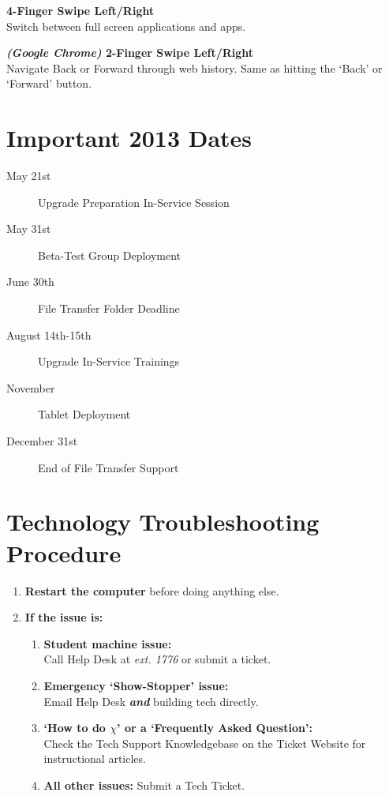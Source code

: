 \documentclass[10pt,foldmark,notumble]{leaflet}
\begin{document}
\textbf{4-Finger Swipe Left/Right}\\
Switch between full screen applications and apps.

\textbf{\emph{(Google Chrome)} 2-Finger Swipe Left/Right}\\
Navigate Back or Forward through web history. Same as hitting the `Back' or `Forward' button.

\section{Important 2013 Dates\color{red}\hrulefill\color{black}}
\begin{description}
	\item[May 21st] \dotfill Upgrade Preparation In-Service Session
	\item[May 31st] \dotfill Beta-Test Group Deployment
	\item[June 30th] \dotfill File Transfer Folder Deadline
	\item[August 14th-15th] \dotfill Upgrade In-Service Trainings
	\item[November] \dotfill Tablet Deployment
	\item[December 31st] \dotfill End of File Transfer Support
\end{description}

\section{Technology Troubleshooting Procedure\color{red}\hrulefill\color{black}}
\begin{enumerate}
	\item \textbf{Restart the computer} before doing anything else.
	\item \textbf{If the issue is:}
		\begin{enumerate}
			\item \textbf{Student machine issue:}\\Call Help Desk at \emph{ext. 1776} or submit a ticket.
			\item \textbf{Emergency `Show-Stopper' issue:}\\Email Help Desk \textbf{\emph{and}} building tech directly.
			\item \textbf{`How to do $\chi$' or a `Frequently Asked Question':}\\Check the Tech Support Knowledgebase on the Ticket Website for instructional articles.
			\item \textbf{All other issues:} Submit a Tech Ticket.
		\end{enumerate}
\end{enumerate}
\end{document}
